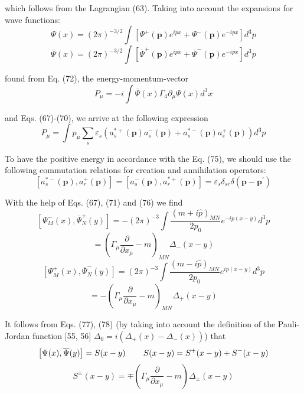 \documentclass[a4paper,12pt]{article}
\begin{document}
which follows from the Lagrangian (63). Taking into account the expansions
for wave functions:
\[
\Psi (x)=(2\pi )^{-3/2}\int \left[ \Psi
^{+}(\mathbf{p})e^{ipx}+\Psi ^{-}( \mathbf{p})e^{-ipx}\right] d^3p
\]
\begin{equation}
\overline{\Psi }(x)=(2\pi )^{-3/2}\int \left[ \overline{\Psi
}^{+}(\mathbf{p} )e^{ipx}+\overline{\Psi
}^{-}(\mathbf{p})e^{-ipx}\right] d^3p  \label{73}
\end{equation}

found from Eq. (72), the energy-momentum-vector
\begin{equation}
P_\mu =-i\int \overline{\Psi }(x)\Gamma _4\partial _\mu \Psi (x)d^3x
\label{74}
\end{equation}

and Eqs. (67)-(70), we arrive at the following expression
\begin{equation}
P_\mu =\int p_\mu \sum_s\varepsilon _s\left(
a_s^{*+}(\mathbf{p})a_s^{-}(
\mathbf{p})+a_s^{*-}(\mathbf{p})a_s^{+}(\mathbf{p})\right) d^3p
\label{75}
\end{equation}

To have the positive energy in accordance with the Eq. (75), we should use
the following commutation relations for creation and annihilation operators:
\begin{equation}
\left[ a_s^{*-}(\mathbf{p}),a_r^{+}(\mathbf{p})\right] =\left[
a_s^{-}( \mathbf{p}),a_r^{*+}(\mathbf{p})\right] =\varepsilon
_s\delta _{sr}\delta ( \mathbf{p}-\mathbf{p}^{\prime })
\label{76}
\end{equation}

With the help of Eqs. (67), (71) and (76) we find
\[
\left[ \Psi _M^{-}(x),\overline{\Psi }_N^{+}(y)\right] =-(2\pi )^{-3}\int
\frac{\left( m+i\widehat{p}\right) _{MN}}{2p_0}e^{-ip(x-y)}d^3p
\]
\begin{equation}
=\left( \Gamma _\mu \frac \partial {\partial x_\mu }-m\right) _{MN}\Delta
_{-}(x-y)  \label{77}
\end{equation}
\[
\left[ \Psi _M^{+}(x),\overline{\Psi }_N^{-}(y)\right] =(2\pi )^{-3}\int
\frac{\left( m-i\widehat{p}\right) _{MN}}{2p_0}e^{ip(x-y)}d^3p
\]
\begin{equation}
=-\left( \Gamma _\mu \frac \partial {\partial x_\mu }-m\right) _{MN}\Delta
_{+}(x-y)  \label{78}
\end{equation}

It follows from Eqs. (77), (78) (by taking into account the definition of
the Pauli-Jordan function [55, 56] $\Delta _0=i\left( \Delta _{+}(x)-\Delta
_{-}(x)\right) $) that
\[
\left[ \Psi (x),\overline{\Psi }(y)\right] =S(x-y)\hspace{0.3in}
S(x-y)=S^{+}(x-y)+S^{-}(x-y)
\]
\begin{equation}
S^{\pm }(x-y)=\mp \left( \Gamma _\mu \frac \partial {\partial x_\mu
}-m\right) \Delta _{\pm }(x-y)  \label{79}
\end{equation}
\end{document}
